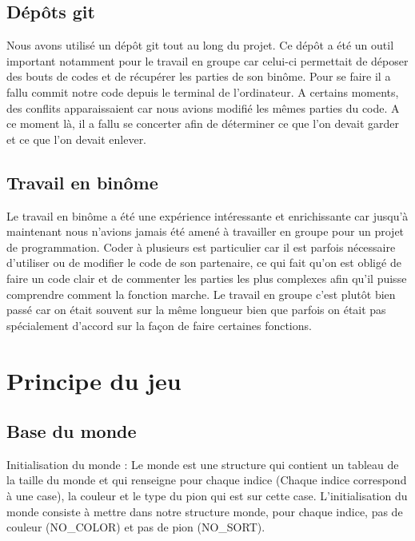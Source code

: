 \documentclass{article}
\begin{document}
\subsection{Dépôts git}

Nous avons utilisé un dépôt git tout au long du projet. Ce dépôt a été un outil important notamment pour le travail en groupe car celui-ci permettait de déposer des bouts de codes et de récupérer les parties de son binôme. Pour se faire il a fallu commit notre code depuis le terminal de l'ordinateur. A certains moments, des conflits apparaissaient car nous avions modifié les mêmes parties du code. A ce moment là, il a fallu se concerter afin de déterminer ce que l'on devait garder et ce que l'on devait enlever.

\subsection{Travail en binôme}
Le travail en binôme a été une expérience intéressante et enrichissante car jusqu'à maintenant nous n'avions jamais été amené à travailler en groupe pour un projet de programmation. Coder à plusieurs est particulier car il est parfois nécessaire d'utiliser ou de modifier le code de son partenaire, ce qui fait qu'on est obligé de faire un code clair et de commenter les parties les plus complexes afin qu'il puisse comprendre comment la fonction marche. Le travail en groupe c'est plutôt bien passé car on était souvent sur la même longueur bien que parfois on était pas spécialement d'accord sur la façon de faire certaines fonctions.


\section{Principe du jeu}

\subsection{Base du monde}



Initialisation du monde : Le monde est une structure qui contient un tableau de la taille du monde et qui renseigne pour chaque indice (Chaque indice correspond à une case), la couleur et le type du pion qui est sur cette case. L’initialisation du monde consiste à mettre dans notre structure monde, pour chaque indice, pas de couleur (NO\_COLOR) et pas de pion (NO\_SORT). \\
\end{document}
